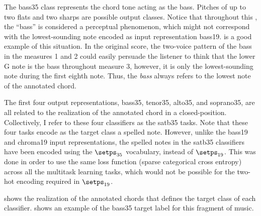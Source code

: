 
The \gls{bass35} class represents the chord tone acting as
the bass. Pitches of up to two flats and two sharps are
possible output classes. Notice that throughout this
\thesisdiss{}, the ``bass'' is considered a perceptual
phenomenon, which might not correspond with the
lowest-sounding note encoded as input representation
\gls{bass19}.  is a good example of
this situation. In the original score, the two-voice pattern
of the bass in the measures 1 and 2 could easily persuade
the listener to think that the lower G note is the bass
throughout measure 3, however, it is only the
lowest-sounding note during the first eighth note. Thus, the
\emph{bass} always refers to the lowest note of the
annotated chord.

The first four output representations, \gls{bass35},
\gls{tenor35}, \gls{alto35}, and \gls{soprano35}, are all
related to the realization of the annotated chord in a
\gls{closed-position}. Collectively, I refer to these four
classifiers as the \gls{satb35} tasks. Note that these four
tasks encode as the target class a spelled note. However,
unlike the \gls{bass19} and \gls{chroma19} input
representations, the spelled notes in the \gls{satb35}
classifiers have been encoded using the $\setps_{35}$
vocabulary, instead of $\setps_{19}$. This was done in order
to use the same loss function (sparse categorical cross
entropy) across all the multitask learning tasks, which
would not be possible for the two-hot encoding required in
$\setps_{19}$.

 shows the realization of the annotated
chords that defines the target class of each classifier.
 shows an example of the \gls{bass35}
target label for this fragment of music.




